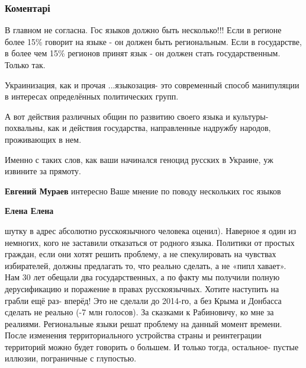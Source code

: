  
 
 
 
 
\subsubsection{Коментарі}
\label{sec:05_10_2021.fb.murajev_jevgenij.1.ukrainizacia.cmt}

\begin{itemize} %

В главном не согласна. Гос языков должно быть несколько!!! Если в регионе более
15\% говорит на языке - он должен быть региональным. Если в государстве, в более
чем 15\% регионов принят язык - он должен стать государственным. Только так.

Украинизация, как и прочая ...языкозация- это современный способ манипуляции в
интересах определённых политических групп.

А вот действия различных общин по развитию своего языка и культуры- похвальны,
как и действия государства, направленные надружбу народов, проживающих в нем.

Именно с таких слов, как ваши начинался геноцид русских в Украине, уж извините
за прямоту.

\begin{itemize} %
\textbf{Евгений Мураев} интересно Ваше мнение по поводу нескольких гос языков

\textbf{Елена Елена} 

шутку в адрес абсолютно русскоязычного человека оценил). Наверное я один из
немногих, кого не заставили отказаться от родного языка. Политики от простых
граждан, если они хотят решить проблему, а не спекулировать на чувствах
избирателей, должны предлагать то, что реально сделать, а не «пипл хавает». Нам
30 лет обещали два государственных, а по факту мы получили полную дерусификацию
и поражение в правах русскоязычных. Хотите наступить на грабли ещё раз- вперёд!
Это не сделали до 2014-го, а без Крыма и Донбасса сделать не реально (-7 млн
голосов). За сказками к Рабиновичу, ко мне за реалиями. Региональные языки
решат проблему на данный момент времени. После изменения территориального
устройства страны и реинтеграции территорий можно будет говорить о большем. И
только тогда, остальное- пустые иллюзии, пограничные с глупостью.


\end{itemize}
\end{itemize}
